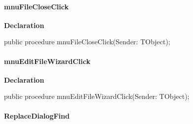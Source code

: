 \documentclass{report}
\newif\ifpdf
\begin{document}
\paragraph*{mnuFileCloseClick}\hspace*{\fill}

\label{editor.TFrmEditor-mnuFileCloseClick}
\begin{list}{}{
\setlength{\itemindent}{0cm}
\setlength{\listparindent}{0cm}
\setlength{\leftmargin}{\evensidemargin}
\addtolength{\leftmargin}{\tmplength}
\settowidth{\labelsep}{X}
\addtolength{\leftmargin}{\labelsep}
\setlength{\labelwidth}{\tmplength}
}
\item[\textbf{Declaration}\hfill]
\ifpdf
\begin{flushleft}
\fi
\begin{ttfamily}
public procedure mnuFileCloseClick(Sender: TObject);\end{ttfamily}

\ifpdf
\end{flushleft}
\fi

\end{list}
\paragraph*{mnuEditFileWizardClick}\hspace*{\fill}

\label{editor.TFrmEditor-mnuEditFileWizardClick}
\begin{list}{}{
\setlength{\itemindent}{0cm}
\setlength{\listparindent}{0cm}
\setlength{\leftmargin}{\evensidemargin}
\addtolength{\leftmargin}{\tmplength}
\settowidth{\labelsep}{X}
\addtolength{\leftmargin}{\labelsep}
\setlength{\labelwidth}{\tmplength}
}
\item[\textbf{Declaration}\hfill]
\ifpdf
\begin{flushleft}
\fi
\begin{ttfamily}
public procedure mnuEditFileWizardClick(Sender: TObject);\end{ttfamily}

\ifpdf
\end{flushleft}
\fi

\end{list}
\paragraph*{ReplaceDialogFind}\hspace*{\fill}
\end{document}
